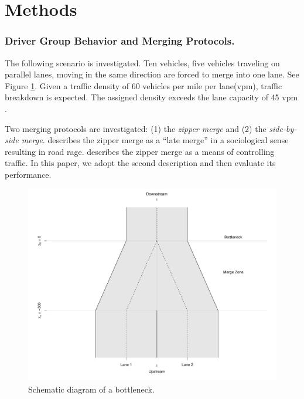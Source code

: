\documentclass[Proceedings]{ascelike}
\begin{document}
\section{Methods}

\subsubsection{Driver Group Behavior and Merging Protocols.} 

The following scenario is investigated. Ten vehicles, five vehicles traveling on  parallel lanes, moving in the same direction are forced to merge into one lane. See Figure \ref{schematic}. Given a traffic density of 60 vehicles per mile per lane(vpm), traffic breakdown is expected.  The assigned density exceeds the lane capacity of 45 vpm \cite{HCM2000}. 

Two merging protocols are investigated: (1) the \emph{zipper merge} and (2) the \emph{side-by-side merge.}  describes the  zipper merge as a ``late merge'' in a sociological sense resulting in road rage.  describes the zipper merge as a means of controlling traffic. In this paper, we adopt the second description and then evaluate its performance. 


\begin{figure}
\centering
\includegraphics[width = 5.5in]{Rplot02.pdf}
\caption{Schematic diagram of a bottleneck.}
\label{schematic}
\end{figure}
\end{document}
